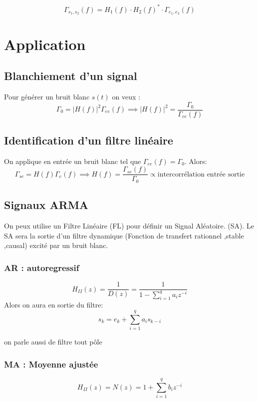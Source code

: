 \documentclass[main.tex]{subfiles}
\begin{document}
\begin{prop}

  \[
\Gamma_{s_1,s_2}(f)=H_1(f)\cdot H_2(f)^*\cdot \Gamma_{e_1,e_2}(f)
  \]
\end{prop}
\section{Application}
\subsection{Blanchiement d'un signal}

Pour générer un bruit blanc $s(t)$ on veux  :
\[
  \Gamma_0 = |H(f)|^2\Gamma_{ee}(f)\implies |H(f)|^2 = \frac{\Gamma_0}{\Gamma_{ee}(f)}
\]


\subsection{Identification d'un filtre linéaire}

On applique en entrée un bruit blanc tel que $\Gamma_{ee}(f)=\Gamma_0$.
Alors:
\[
  \Gamma_{se}=H(f)\Gamma_e(f) \implies H(f)=\frac{\Gamma_{se}(f)}{\Gamma_0} \propto \text{intercorrélation entrée sortie}
\]


\subsection{Signaux ARMA}

On peux utilise un Filtre Linéaire (FL) pour définir un Signal Aléatoire.
(SA).
Le SA sera la sortie d'un filtre dynamique (Fonction de transfert rationnel ,stable ,causal) excité par un bruit blanc.


\subsubsection{AR : autoregressif}


\[
  \boxed{
    H_{II}(z) = \frac{1}{D(z)}=\frac{1}{1-\sum_{i=1}^qa_iz^{-i}}
  }
\]
Alors on aura en sortie du filtre:
\[
  s_k= e_k + \sum_{i=1}^qa_is_{k-i}
\]

on parle aussi de filtre \og tout pôle\fg{}

\subsubsection{MA : Moyenne ajustée}

\[
  \boxed{
    H_{II}(z) = N(z)= 1+\sum_{i=1}^qb_iz^{-i}
  }
\]
\end{document}
